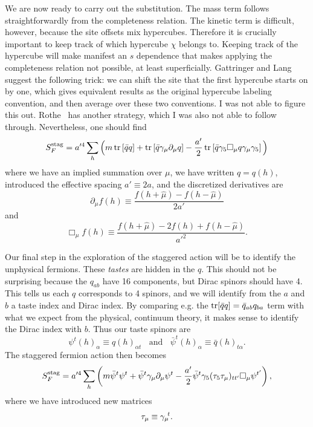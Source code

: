 We are now ready to carry out the substitution. The mass term follows
straightforwardly from the completeness relation. The kinetic term is
difficult, however, because the site offsets mix hypercubes. Therefore
it is crucially important to keep track of which hypercube $\chi$
belongs to. Keeping track of the hypercube will make manifest an $s$
dependence that makes applying the completeness relation not possible,
at least superficially. Gattringer and Lang~\cite{gattringer_quantum_2010}
suggest the following trick: we can shift the site that the first
hypercube starts on by one, which gives equivalent results as the
original hypercube labeling convention, and then average over these
two conventions. I was not able to figure this out. 
Rothe~\cite{rothe_lattice_2005} has another strategy, which I was also
not able to follow through. Nevertheless, one should find
\begin{equation}
S_F^{\rm stag}=a'^4\sum_h\Big(m\tr\left[\bar{q}q\right]
+\tr\left[\bar{q}\gamma_\mu\partial_\mu q\right]
-\frac{a'}{2}\tr\left[\bar{q}\gamma_5\Box_\mu q\gamma_\mu\gamma_5\right]\Big)
\end{equation}
where we have an implied summation over $\mu$, we have written
$q=q(h)$, introduced the effective spacing $a'\equiv2a$, and 
the discretized derivatives are
\begin{equation}
  \partial_\mu f(h)\equiv\frac{f(h+\hat{\mu})-f(h-\hat{\mu})}{2a'}
\end{equation}
and
\begin{equation}
  \Box_\mu f(h)\equiv\frac{f(h+\hat{\mu})-2f(h)+f(h-\hat{\mu})}{a'^2}.
\end{equation}

Our final step in the exploration of the staggered action will be to
identify the unphysical fermions. These {\it tastes} are hidden in
the $q$. This should not be surprising because the $q_{ab}$ have 16
components, but Dirac spinors should have 4. This
tells us each $q$ corresponds to 4 spinors, and we will identify from
the $a$ and $b$ a taste index and Dirac index.
By comparing e.g. the $\tr[\bar{q}q]=\bar{q}_{ab}q_{ba}$ term with
what we expect from the physical, continuum theory, it makes sense
to identify the Dirac index with $b$. Thus our taste spinors are
\begin{equation}
  \psi^{t}(h)_\alpha\equiv q(h)_{\alpha t}~~~~\text{and}~~~~
  \bar{\psi}^{t}(h)_\alpha\equiv \bar{q}(h)_{t\alpha}.
\end{equation}
The staggered fermion action then becomes
\begin{equation}\label{eq:staggPhys}
S_F^{\rm stag}=a'^4\sum_h\left(
m\bar{\psi}^{t}\psi^{t}
+\bar{\psi}^{t}\gamma_\mu\partial_\mu\psi^{t}
-\frac{a'}{2}\bar{\psi}^{t}\gamma_5(\tau_5\tau_\mu)_{tt'}\Box_\mu\psi^{t'}
\right),
\end{equation}
where we have introduced new matrices
\begin{equation}
\tau_\mu\equiv\trans{\gamma_\mu}.
\end{equation}

